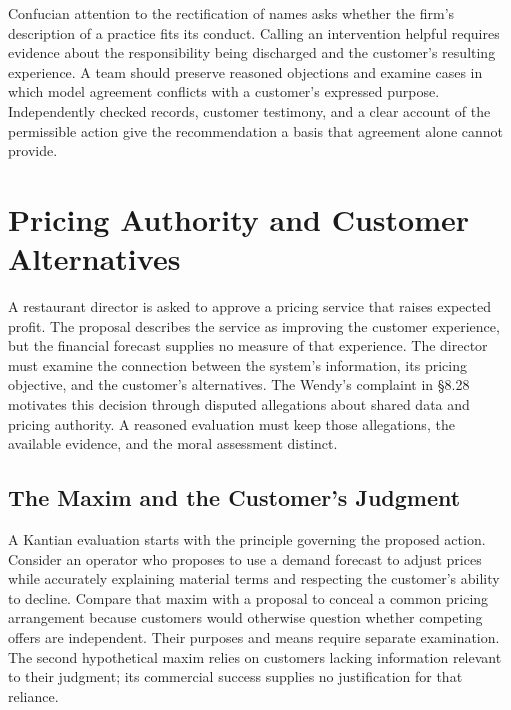 Confucian attention to the rectification of names asks whether the
firm's description of a practice fits its conduct. Calling an
intervention helpful requires evidence about the responsibility being
discharged and the customer's resulting experience. A team should
preserve reasoned objections and examine cases in which model agreement
conflicts with a customer's expressed purpose. Independently checked
records, customer testimony, and a clear account of the permissible
action give the recommendation a basis that agreement alone cannot
provide.


\hypertarget{M09-pricing-authority-and-customer-alternatives}{%
\section{Pricing Authority and Customer
Alternatives}\label{M09-pricing-authority-and-customer-alternatives}}

\noindent \noindent A restaurant director is asked to approve a pricing service
that raises expected profit. The proposal describes the service as
improving the customer experience, but the financial forecast supplies
no measure of that experience. The director must examine the connection
between the system's information, its pricing objective, and the
customer's alternatives. The Wendy's complaint in §8.28 motivates this
decision through disputed allegations about shared data and pricing
authority. A reasoned evaluation must keep those allegations, the
available evidence, and the moral assessment distinct.

\hypertarget{M09-the-maxim-and-the-customers-judgment}{%
\subsection{The Maxim and the Customer's
Judgment}\label{M09-the-maxim-and-the-customers-judgment}}

\noindent \noindent A Kantian evaluation starts with the principle governing the
proposed action. Consider an operator who proposes to use a demand
forecast to adjust prices while accurately explaining material terms and
respecting the customer's ability to decline. Compare that maxim with a
proposal to conceal a common pricing arrangement because customers would
otherwise question whether competing offers are independent. Their
purposes and means require separate examination. The second hypothetical
maxim relies on customers lacking information relevant to their
judgment; its commercial success supplies no justification for that
reliance.

